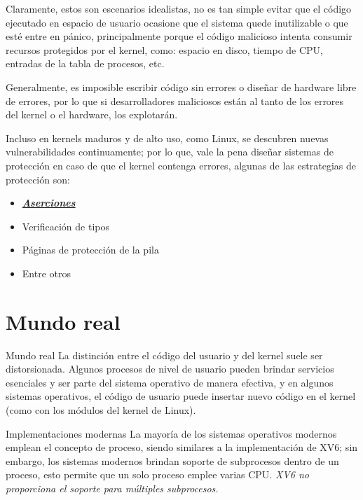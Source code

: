 \documentclass{libs/ufc_format}
\begin{document}
\begin{frame}{}
  Claramente, estos son escenarios idealistas, no es tan simple evitar que el código ejecutado en espacio de usuario ocasione que el sistema quede inutilizable o que esté entre en pánico, principalmente porque el código malicioso intenta consumir recursos protegidos por el kernel, como: espacio en disco, tiempo de CPU, entradas de la tabla de procesos, etc. \cite{xv6_book}

  \vspace{0.3cm}

  Generalmente, es imposible escribir código sin errores o diseñar de hardware libre de errores, por lo que si desarrolladores maliciosos están al tanto de los errores del kernel o el hardware, los explotarán. \cite{xv6_book}
\end{frame}
\begin{frame}{}
  Incluso en kernels maduros y de alto uso, como Linux, se descubren nuevas vulnerabilidades continuamente; por lo que, vale la pena diseñar sistemas de protección en caso de que el kernel contenga errores, algunas de las estrategias de protección son:

  \begin{itemize}
    \item \href{https://en.wikipedia.org/wiki/Assertion\_(software\_development)}{\textbf{\textit{Aserciones}}}
    \item Verificación de tipos
    \item Páginas de protección de la pila
    \item Entre otros
  \end{itemize}
\end{frame}
\section{Mundo real}
\begin{frame}{Mundo real}
  La distinción entre el código del usuario y del kernel suele ser distorsionada. Algunos procesos de nivel de usuario pueden brindar servicios esenciales y ser parte del sistema operativo de manera efectiva, y en algunos sistemas operativos, el código de usuario puede insertar nuevo código en el kernel (como con los módulos del kernel de Linux). \cite{xv6_book}
\end{frame}
\begin{frame}{Implementaciones modernas}
  La mayoría de los sistemas operativos modernos emplean el concepto de proceso, siendo similares a la implementación de XV6; sin embargo, los sistemas modernos brindan soporte de subprocesos dentro de un proceso, esto permite que un solo proceso emplee varias CPU. \newline
  \emph{XV6 no proporciona el soporte para múltiples subprocesos.}
\end{frame}
\end{document}
